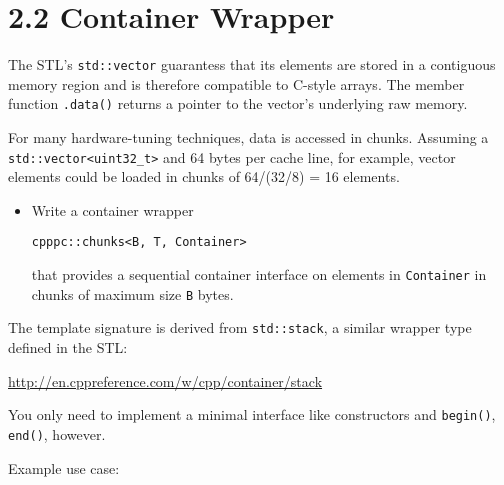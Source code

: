 \documentclass[]{article}
\begin{document}

\section{2.2 Container Wrapper}\label{container-wrapper}

The STL's \texttt{std::vector} guarantess that its elements are stored
in a contiguous memory region and is therefore compatible to C-style
arrays. The member function \texttt{.data()} returns a pointer to the
vector's underlying raw memory.

For many hardware-tuning techniques, data is accessed in chunks.
Assuming a \texttt{std::vector\textless{}uint32\_t\textgreater{}} and 64
bytes per cache line, for example, vector elements could be loaded in
chunks of 64/(32/8) = 16 elements.

\begin{itemize}
\item
  Write a container wrapper

\begin{verbatim}
cpppc::chunks<B, T, Container>
\end{verbatim}

  that provides a sequential container interface on elements in
  \texttt{Container} in chunks of maximum size \texttt{B} bytes.
\end{itemize}

The template signature is derived from \texttt{std::stack}, a similar
wrapper type defined in the STL:

\url{http://en.cppreference.com/w/cpp/container/stack}

You only need to implement a minimal interface like constructors and
\texttt{begin()}, \texttt{end()}, however.

Example use case:
\end{document}
